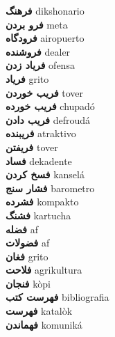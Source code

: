 \textbf{ فرهنگ  } dikshonario \\
\textbf{ فرو بردن  } meta \\
\textbf{ فرودگاه  } airopuerto \\
\textbf{ فروشنده  } dealer \\
\textbf{ فریاد زدن  } ofensa \\
\textbf{ فریاد  } grito \\
\textbf{ فریب خوردن  } tover \\
\textbf{ فریب خورده  } chupadó \\
\textbf{ فریب دادن  } defroudá \\
\textbf{ فریبنده  } atraktivo \\
\textbf{ فریفتن  } tover \\
\textbf{ فساد  } dekadente \\
\textbf{ فسخ کردن  } kanselá \\
\textbf{ فشار سنج  } barometro \\
\textbf{ فشرده  } kompakto \\
\textbf{ فشنگ  } kartucha \\
\textbf{ فضله  } af \\
\textbf{ فضولات  } af \\
\textbf{ فغان  } grito \\
\textbf{ فلاحت  } agrikultura \\
\textbf{ فنجان  } kòpi \\
\textbf{ فهرست کتب  } bibliografia \\
\textbf{ فهرست  } katalòk \\
\textbf{ فهماندن  } komuniká \\
